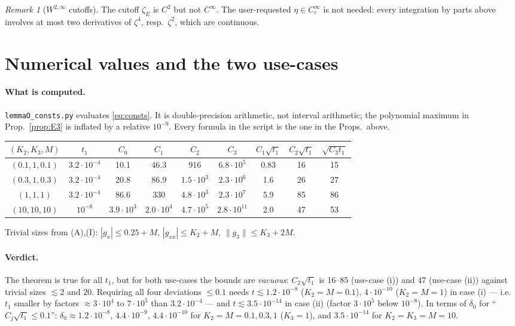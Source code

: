 \documentclass[11pt]{article}
\theoremstyle{remark}\newtheorem{remark}[theorem]{Remark}
\newcommand{\nrm}[1]{\lVert #1\rVert}
\begin{document}
\begin{remark}[$W^{2,\infty}$ cutoffs]
The cutoff $\zeta_E$ is $C^2$ but not $C^\infty$. The user-requested $\eta\in C_c^\infty$ is not needed: every integration by parts above involves at most two derivatives of $\zeta^4$, resp.\ $\zeta^2$, which are continuous.
\end{remark}

\section{Numerical values and the two use-cases}\label{sec:use}
\paragraph{What is computed.} \texttt{lemmaO\_consts.py} evaluates \eqref{eq:consts}. It is double-precision arithmetic, not interval arithmetic; the polynomial maximum in Prop.~\ref{prop:E3} is inflated by a relative $10^{-9}$. Every formula in the script is the one in the Props.\ above.

\begin{table}[h]\centering\small
\begin{tabular}{ccccccccc}\toprule
$(K_2,K_3,M)$ & $t_1$ & $C_0$ & $C_1$ & $C_2$ & $C_3$ & $C_1\sqrt{t_1}$ & $C_2\sqrt{t_1}$ & $\sqrt{C_3t_1}$\\\midrule
$(0.1,1,0.1)$ & $3.2\cdot10^{-4}$ & 10.1 & 46.3 & 916 & $6.8\cdot10^{5}$ & 0.83 & 16 & 15\\
$(0.3,1,0.3)$ & $3.2\cdot10^{-4}$ & 20.8 & 86.9 & $1.5\cdot10^3$ & $2.3\cdot10^6$ & 1.6 & 26 & 27\\
$(1,1,1)$ & $3.2\cdot10^{-4}$ & 86.6 & 330 & $4.8\cdot10^3$ & $2.3\cdot10^7$ & 5.9 & 85 & 86\\
$(10,10,10)$ & $10^{-8}$ & $3.9\cdot10^3$ & $2.0\cdot10^4$ & $4.7\cdot10^5$ & $2.8\cdot10^{11}$ & 2.0 & 47 & 53\\\bottomrule
\end{tabular}\end{table}
Trivial sizes from (A),(I): $|g_x|\le0.25+M$, $|g_{xx}|\le K_2+M$, $\nrm{g_3}\le K_3+2M$.

\paragraph{Verdict.} The theorem is true for all $t_1$, but for both use-cases the bounds are \emph{vacuous}: $C_2\sqrt{t_1}$ is 16--85 (use-case (i)) and 47 (use-case (ii)) against trivial sizes $\lesssim 2$ and $20$. Requiring all four deviations $\le0.1$ needs $t\lesssim 1.2\cdot10^{-8}$ ($K_2=M=0.1$), $4\cdot10^{-10}$ ($K_2=M=1$) in case (i) --- i.e.\ $t_1$ smaller by factors $\approx3\cdot10^4$ to $7\cdot10^5$ than $3.2\cdot10^{-4}$ --- and $t\lesssim3.5\cdot10^{-14}$ in case (ii) (factor $3\cdot10^5$ below $10^{-8}$). In terms of $\delta_0$ for ``$C_j\sqrt{t_1}\le0.1$'': $\delta_0\approx1.2\cdot10^{-8}$, $4.4\cdot10^{-9}$, $4.4\cdot10^{-10}$ for $K_2=M=0.1,0.3,1$ ($K_3=1$), and $3.5\cdot10^{-14}$ for $K_2=K_3=M=10$.
\end{document}
